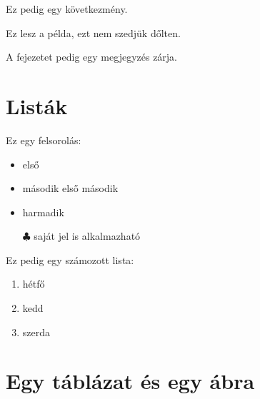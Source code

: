 \begin{köv}
Ez pedig egy következmény.
\end{köv}

\begin{pld}
	Ez lesz a példa, ezt nem szedjük dőlten.
\end{pld}

\begin{megj}
	A fejezetet pedig egy megjegyzés zárja.
\end{megj}


\section{Listák}

Ez egy felsorolás:
\begin{itemize}
	\item első
	\item második
	      \subitem első
	      \subitem második
	\item harmadik
	\item[$\clubsuit$]  saját jel is alkalmazható
\end{itemize}
Ez pedig egy számozott lista:
\begin{enumerate}
	\item hétfő
	\item kedd
	\item szerda
\end{enumerate}

\pagebreak


\section{Egy táblázat és egy ábra}

